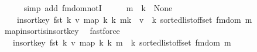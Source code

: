 \begin{isabellebody}
\ \ \ \ \isamarkupfalse%
\ {\isacharparenleft}{\kern0pt}simp\ add{\isacharcolon}{\kern0pt}\ fmdom{\isacharunderscore}{\kern0pt}notI{\isacharparenright}{\kern0pt}\isanewline
\ \ \isamarkupfalse%
\ \isamarkupfalse%
\ {\isacartoucheopen}m\ {\isachardollar}{\kern0pt}{\isachardollar}{\kern0pt}\ k\ {\isacharequal}{\kern0pt}\ None{\isacartoucheclose}\ \isamarkupfalse%
\ {\isachardoublequoteopen}{\isasymdots}\ {\isacharequal}{\kern0pt}\isanewline
\ \ \ \ insort{\isacharunderscore}{\kern0pt}key\ fst\ {\isacharparenleft}{\kern0pt}k{\isacharcomma}{\kern0pt}\ v{\isacharparenright}{\kern0pt}\ {\isacharparenleft}{\kern0pt}map\ {\isacharparenleft}{\kern0pt}{\isasymlambda}k{\isacharprime}{\kern0pt}{\isachardot}{\kern0pt}\ {\isacharparenleft}{\kern0pt}k{\isacharprime}{\kern0pt}{\isacharcomma}{\kern0pt}\ m{\isacharparenleft}{\kern0pt}k\ {\isachardollar}{\kern0pt}{\isachardollar}{\kern0pt}{\isacharcolon}{\kern0pt}{\isacharequal}{\kern0pt}\ v{\isacharparenright}{\kern0pt}\ {\isachardollar}{\kern0pt}{\isachardollar}{\kern0pt}{\isacharbang}{\kern0pt}\ k{\isacharprime}{\kern0pt}{\isacharparenright}{\kern0pt}{\isacharparenright}{\kern0pt}\ {\isacharparenleft}{\kern0pt}sorted{\isacharunderscore}{\kern0pt}list{\isacharunderscore}{\kern0pt}of{\isacharunderscore}{\kern0pt}fset\ {\isacharparenleft}{\kern0pt}fmdom\ m{\isacharparenright}{\kern0pt}{\isacharparenright}{\kern0pt}{\isacharparenright}{\kern0pt}{\isachardoublequoteclose}\isanewline
\ \ \ \ \isamarkupfalse%
\ map{\isacharunderscore}{\kern0pt}insort{\isacharunderscore}{\kern0pt}is{\isacharunderscore}{\kern0pt}insort{\isacharunderscore}{\kern0pt}key\ \isamarkupfalse%
\ fastforce\isanewline
\ \ \isamarkupfalse%
\ \isamarkupfalse%
\ {\isachardoublequoteopen}{\isasymdots}\ {\isacharequal}{\kern0pt}\ insort{\isacharunderscore}{\kern0pt}key\ fst\ {\isacharparenleft}{\kern0pt}k{\isacharcomma}{\kern0pt}\ v{\isacharparenright}{\kern0pt}\ {\isacharparenleft}{\kern0pt}map\ {\isacharparenleft}{\kern0pt}{\isasymlambda}k{\isacharprime}{\kern0pt}{\isachardot}{\kern0pt}\ {\isacharparenleft}{\kern0pt}k{\isacharprime}{\kern0pt}{\isacharcomma}{\kern0pt}\ m\ {\isachardollar}{\kern0pt}{\isachardollar}{\kern0pt}{\isacharbang}{\kern0pt}\ k{\isacharprime}{\kern0pt}{\isacharparenright}{\kern0pt}{\isacharparenright}{\kern0pt}\ {\isacharparenleft}{\kern0pt}sorted{\isacharunderscore}{\kern0pt}list{\isacharunderscore}{\kern0pt}of{\isacharunderscore}{\kern0pt}fset\ {\isacharparenleft}{\kern0pt}fmdom\ m{\isacharparenright}{\kern0pt}{\isacharparenright}{\kern0pt}{\isacharparenright}{\kern0pt}{\isachardoublequoteclose}\isanewline

\end{isabellebody}
